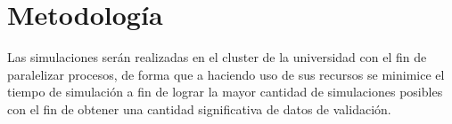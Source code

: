 %	
%	
%	
%
	
\section{Metodología}
	Las simulaciones ser\'an realizadas en el cluster de la universidad con el fin de paralelizar procesos, de forma que a haciendo uso de sus recursos se minimice el tiempo de simulación a fin de lograr la mayor cantidad de simulaciones posibles con el fin de obtener una cantidad significativa de datos de validación.
	

